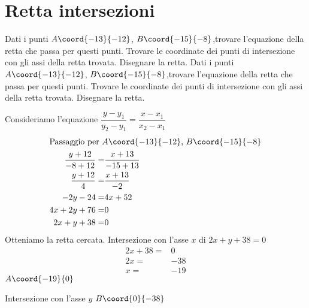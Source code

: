 \section{Retta intersezioni}
\begin{exercise}
	Dati i punti  $A\coord{-13}{-12}$, $B\coord{-15}{-8}$,trovare l'equazione della retta che passa per questi punti. Trovare le coordinate dei punti di intersezione con gli assi della retta trovata. Disegnare la retta.
	\tcblower
	Dati i punti  $A\coord{-13}{-12}$, $B\coord{-15}{-8}$,trovare l'equazione della retta che passa per questi punti. Trovare le coordinate dei punti di intersezione con gli assi della retta trovata. Disegnare la retta.
	
	Consideriamo l'equazione  $\dfrac{y-y_1}{y_2-y_1}=\dfrac{x-x_1}{x_2-x_1}$
	\begin{align*}
		\intertext{Passaggio per  $A\coord{-13}{-12}$, $B\coord{-15}{-8}$}
		\dfrac{y+12}{-8+12}=&\dfrac{x+13}{-15+13}\\
		\dfrac{y+12}{4}=&\dfrac{x+13}{-2}\\
		-2y-24=&4x+52\\
		4x+2y+76=&0\\
		2x+y+38=&0\\
	\end{align*}
	Otteniamo la retta cercata.
	Intersezione con l'asse $x$ di $2x+y+38=0$
	\begin{align*}
		2x+38=&0\\
		2x=&-38\\
		x=&-19
	\end{align*}
	$A\coord{-19}{0}$
	
	Intersezione con l'asse $y$
	$B\coord{0}{-38}$
		\begin{center}
			
		\end{center}
\end{exercise}
